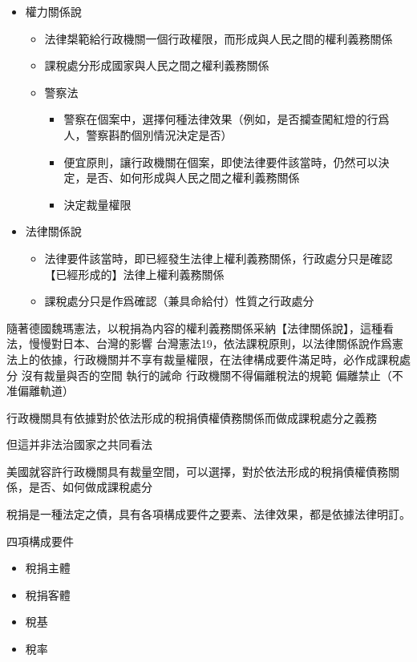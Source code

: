 \documentclass[]{ctexbook}
\providecommand{\tightlist}{%
  \setlength{\itemsep}{0pt}\setlength{\parskip}{0pt}}
\begin{document}
\begin{itemize}
\tightlist
\item
  權力關係說

  \begin{itemize}
  \tightlist
  \item
    法律槼範給行政機關一個行政權限，而形成與人民之間的權利義務關係
  \item
    課稅處分形成國家與人民之間之權利義務關係
  \item
    警察法

    \begin{itemize}
    \tightlist
    \item
      警察在個案中，選擇何種法律效果（例如，是否攔查闖紅燈的行爲人，警察斟酌個別情況決定是否）
    \item
      便宜原則，讓行政機關在個案，即使法律要件該當時，仍然可以決定，是否、如何形成與人民之間之權利義務關係
    \item
      決定裁量權限
    \end{itemize}
  \end{itemize}
\item
  法律關係說

  \begin{itemize}
  \tightlist
  \item
    法律要件該當時，即已經發生法律上權利義務關係，行政處分只是確認【已經形成的】法律上權利義務關係
  \item
    課稅處分只是作爲確認（兼具命給付）性質之行政處分
  \end{itemize}
\end{itemize}

隨著德國魏瑪憲法，以稅捐為内容的權利義務關係采納【法律關係說】，這種看法，慢慢對日本、台灣的影響
台灣憲法19，依法課稅原則，以法律關係說作爲憲法上的依據，行政機關并不享有裁量權限，在法律構成要件滿足時，必作成課稅處分
沒有裁量與否的空間
執行的誡命
行政機關不得偏離稅法的規範
偏離禁止（不准偏離軌道）

行政機關具有依據對於依法形成的稅捐債權債務關係而做成課稅處分之義務

但這并非法治國家之共同看法

美國就容許行政機關具有裁量空間，可以選擇，對於依法形成的稅捐債權債務關係，是否、如何做成課稅處分

稅捐是一種法定之債，具有各項構成要件之要素、法律效果，都是依據法律明訂。

四項構成要件

\begin{itemize}
\tightlist
\item
  稅捐主體
\item
  稅捐客體
\item
  稅基
\item
  稅率
\end{itemize}
\end{document}
